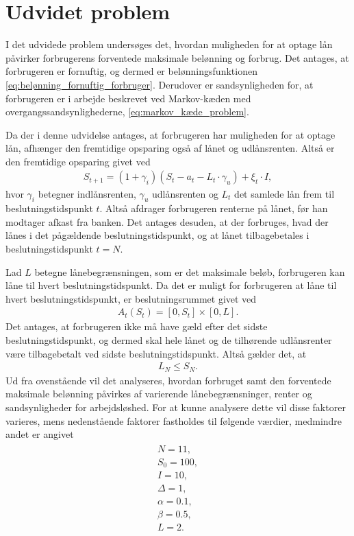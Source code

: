 \pagebreak

\section{Udvidet problem}
I det udvidede problem undersøges det, hvordan muligheden for at optage lån påvirker forbrugerens forventede maksimale belønning og forbrug. Det antages, at forbrugeren er fornuftig, og dermed er belønningsfunktionen \eqref{eq:belønning_fornuftig_forbruger}. Derudover er sandsynligheden for, at forbrugeren er i arbejde beskrevet ved Markov-kæden med overgangssandsynlighederne, \eqref{eq:markov_kæde_problem}.

Da der i denne udvidelse antages, at forbrugeren har muligheden for at optage lån, afhænger den fremtidige opsparing også af lånet og udlånsrenten. Altså er den fremtidige opsparing givet ved
\begin{align*} 
    S_{t+1} =(1 + \gamma_i)(S_t-a_t - L_t \cdot \gamma_u) + \xi_t \cdot I,
\end{align*}
hvor $\gamma_i$ betegner indlånsrenten, $\gamma_u$ udlånsrenten og $L_t$ det samlede lån frem til beslutningstidspunkt $t$. Altså afdrager forbrugeren renterne på lånet, før han modtager afkast fra banken. 
Det antages desuden, at der forbruges, hvad der lånes i det pågældende beslutningstidspunkt, og at lånet tilbagebetales i beslutningstidspunkt $t=N$.

Lad $L$ betegne lånebegrænsningen, som er det maksimale beløb, forbrugeren kan låne til hvert beslutningstidspunkt. Da det er muligt for forbrugeren at låne til hvert beslutningstidspunkt, er beslutningsrummet givet ved
\begin{align*}
    A_t(S_t) = [0, S_t] \times [0, L].
\end{align*}
%
Det antages, at forbrugeren ikke må have gæld efter det sidste beslutningstidspunkt, og dermed skal hele lånet og de tilhørende udlånsrenter være tilbagebetalt ved sidste beslutningstidspunkt. Altså gælder det, at
\begin{align*}
    L_N \leq S_N.
\end{align*}
Ud fra ovenstående vil det analyseres, hvordan forbruget samt den forventede maksimale belønning påvirkes af varierende lånebegrænsninger, renter og sandsynligheder for arbejdsløshed. For at kunne analysere dette vil disse faktorer varieres, mens nedenstående faktorer fastholdes til følgende værdier, medmindre andet er angivet
\begin{align}\label{fastevariable}
    \begin{split}
        N=11,\\
        S_0 = 100,\\
        I=10,\\
        \Delta = 1,\\
        \alpha = 0.1, \\
        \beta = 0.5,\\
        L = 2.\
    \end{split}
\end{align}

